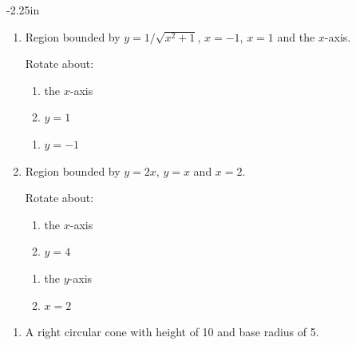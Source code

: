 \begin{adjustwidth*}{}{-2.25in}
\begin{multicols*}{2}
\begin{enumerate}[1),resume]
\item Region bounded by $y=1/\sqrt{x^2+1}$, $x=-1$, $x=1$ and the $x$-axis.

Rotate about:

\noindent%
\begin{minipage}[t]{.5\linewidth}
\begin{enumerate}
\item		the $x$-axis
\item		$y=1$
\end{enumerate}
\end{minipage}
\begin{minipage}[t]{.5\linewidth}
\begin{enumerate}\addtocounter{enumii}{2}
\item		$y=-1$
\end{enumerate}
\end{minipage}

\item Region bounded by $y=2x$, $y=x$ and $x=2$.

Rotate about:

\noindent%
\begin{minipage}[t]{.5\linewidth}
\begin{enumerate}
\item		the $x$-axis
\item		$y=4$
\end{enumerate}
\end{minipage}
\begin{minipage}[t]{.5\linewidth}
\begin{enumerate}\addtocounter{enumii}{2}
\item		the $y$-axis
\item		$x=2$
\end{enumerate}
\end{minipage}

\end{enumerate}


\begin{enumerate}[1),resume]
\item A right circular cone with height of 10 and base radius of 5. \label{ex_07_02_ex_18}

\end{enumerate}
\end{multicols*}
\end{adjustwidth*}
